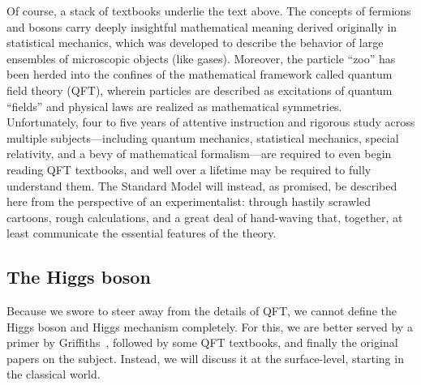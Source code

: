 Of course, a stack of textbooks underlie the text above.
The concepts of fermions and bosons carry deeply insightful mathematical meaning derived originally in statistical mechanics, which was developed to describe the behavior of large ensembles of microscopic objects (like gases). 
Moreover, the particle ``zoo'' has been herded into the confines of the mathematical framework called quantum field theory (QFT), wherein particles are described as excitations of quantum ``fields'' and physical laws are realized as mathematical symmetries. 
Unfortunately, four to five years of attentive instruction and rigorous study across multiple subjects---including quantum mechanics, statistical mechanics, special relativity, and a bevy of mathematical formalism---are required to even begin reading QFT textbooks, and well over a lifetime may be required to fully understand them\footnotemark{}. 
The Standard Model will instead, as promised, be described here from the perspective of an experimentalist: through hastily scrawled cartoons, rough calculations, and a great deal of hand-waving that, together, at least communicate the essential features of the theory. 

\subsection{The Higgs boson}
%
%
Because we swore to steer away from the details of QFT, we cannot define the Higgs boson and Higgs mechanism completely. 
For this, we are better served by a primer by Griffiths~\cite{Griffiths}, followed by some QFT textbooks, and finally the original papers on the subject. %
Instead, we will discuss it at the surface-level, starting in the classical world. 

